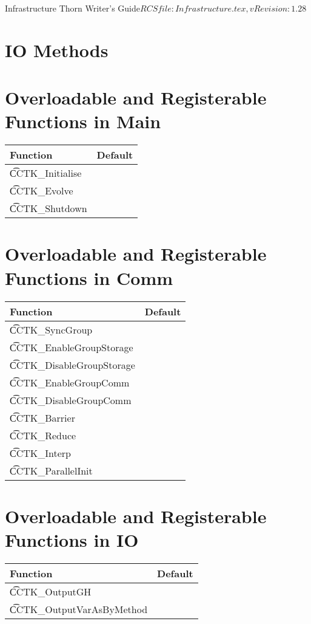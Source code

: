 \begin{cactuspart}{4}{Infrastructure Thorn Writer's Guide}{$RCSfile: Infrastructure.tex,v $}{$Revision: 1.28 $}
\chapter{IO Methods}
\label{chap:iome}

\chapter{Overloadable and Registerable Functions in Main}

 \begin{tabular}{|l|l|}
   \hline  {\bf Function} & {\bf Default} \\
   \hline {\t CCTK\_Initialise}           &\\
   \hline {\t CCTK\_Evolve}               &\\
   \hline {\t CCTK\_Shutdown}             &\\
   \hline
 \end{tabular}

\chapter{Overloadable and Registerable Functions in Comm}

  \begin{tabular}{|l|l|}
   \hline {\bf Function} & {\bf Default}  \\
   \hline {\t CCTK\_SyncGroup}           &\\
   \hline {\t CCTK\_EnableGroupStorage}  &\\
   \hline {\t CCTK\_DisableGroupStorage} &\\
   \hline {\t CCTK\_EnableGroupComm}     &\\
   \hline {\t CCTK\_DisableGroupComm}    &\\
   \hline {\t CCTK\_Barrier}             &\\
   \hline {\t CCTK\_Reduce}              &\\
   \hline {\t CCTK\_Interp}              &\\
   \hline {\t CCTK\_ParallelInit}        &\\
   \hline
  \end{tabular}

\chapter{Overloadable and Registerable Functions in IO}

 \begin{tabular}{|l|l|} 
   \hline {\bf Function} & {\bf Default}   \\
   \hline {\t CCTK\_OutputGH}            & \\
   \hline {\t CCTK\_OutputVarAsByMethod} & \\
   \hline
 \end{tabular}


\end{cactuspart}
